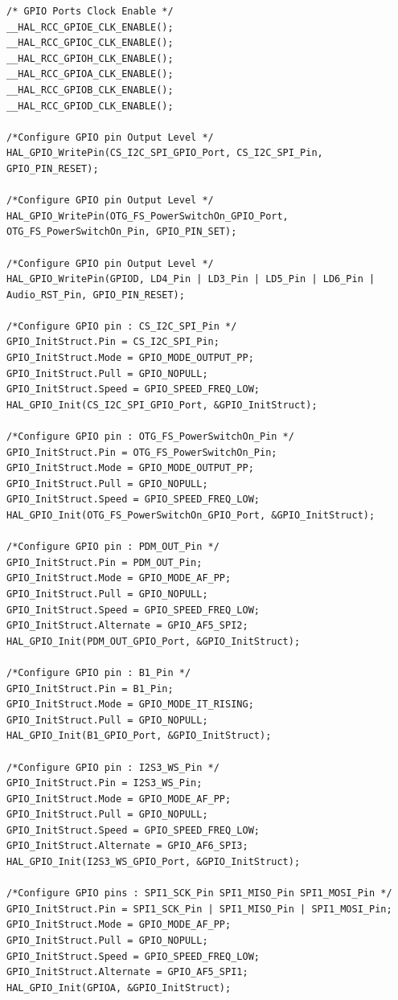 \documentclass[12pt]{report}
\begin{document}
\begin{appendix}
\begin{lstlisting}[basicstyle=\scriptsize\ttfamily]
/* GPIO Ports Clock Enable */
__HAL_RCC_GPIOE_CLK_ENABLE();
__HAL_RCC_GPIOC_CLK_ENABLE();
__HAL_RCC_GPIOH_CLK_ENABLE();
__HAL_RCC_GPIOA_CLK_ENABLE();
__HAL_RCC_GPIOB_CLK_ENABLE();
__HAL_RCC_GPIOD_CLK_ENABLE();

/*Configure GPIO pin Output Level */
HAL_GPIO_WritePin(CS_I2C_SPI_GPIO_Port, CS_I2C_SPI_Pin, GPIO_PIN_RESET);

/*Configure GPIO pin Output Level */
HAL_GPIO_WritePin(OTG_FS_PowerSwitchOn_GPIO_Port, OTG_FS_PowerSwitchOn_Pin, GPIO_PIN_SET);

/*Configure GPIO pin Output Level */
HAL_GPIO_WritePin(GPIOD, LD4_Pin | LD3_Pin | LD5_Pin | LD6_Pin | Audio_RST_Pin, GPIO_PIN_RESET);

/*Configure GPIO pin : CS_I2C_SPI_Pin */
GPIO_InitStruct.Pin = CS_I2C_SPI_Pin;
GPIO_InitStruct.Mode = GPIO_MODE_OUTPUT_PP;
GPIO_InitStruct.Pull = GPIO_NOPULL;
GPIO_InitStruct.Speed = GPIO_SPEED_FREQ_LOW;
HAL_GPIO_Init(CS_I2C_SPI_GPIO_Port, &GPIO_InitStruct);

/*Configure GPIO pin : OTG_FS_PowerSwitchOn_Pin */
GPIO_InitStruct.Pin = OTG_FS_PowerSwitchOn_Pin;
GPIO_InitStruct.Mode = GPIO_MODE_OUTPUT_PP;
GPIO_InitStruct.Pull = GPIO_NOPULL;
GPIO_InitStruct.Speed = GPIO_SPEED_FREQ_LOW;
HAL_GPIO_Init(OTG_FS_PowerSwitchOn_GPIO_Port, &GPIO_InitStruct);

/*Configure GPIO pin : PDM_OUT_Pin */
GPIO_InitStruct.Pin = PDM_OUT_Pin;
GPIO_InitStruct.Mode = GPIO_MODE_AF_PP;
GPIO_InitStruct.Pull = GPIO_NOPULL;
GPIO_InitStruct.Speed = GPIO_SPEED_FREQ_LOW;
GPIO_InitStruct.Alternate = GPIO_AF5_SPI2;
HAL_GPIO_Init(PDM_OUT_GPIO_Port, &GPIO_InitStruct);

/*Configure GPIO pin : B1_Pin */
GPIO_InitStruct.Pin = B1_Pin;
GPIO_InitStruct.Mode = GPIO_MODE_IT_RISING;
GPIO_InitStruct.Pull = GPIO_NOPULL;
HAL_GPIO_Init(B1_GPIO_Port, &GPIO_InitStruct);

/*Configure GPIO pin : I2S3_WS_Pin */
GPIO_InitStruct.Pin = I2S3_WS_Pin;
GPIO_InitStruct.Mode = GPIO_MODE_AF_PP;
GPIO_InitStruct.Pull = GPIO_NOPULL;
GPIO_InitStruct.Speed = GPIO_SPEED_FREQ_LOW;
GPIO_InitStruct.Alternate = GPIO_AF6_SPI3;
HAL_GPIO_Init(I2S3_WS_GPIO_Port, &GPIO_InitStruct);

/*Configure GPIO pins : SPI1_SCK_Pin SPI1_MISO_Pin SPI1_MOSI_Pin */
GPIO_InitStruct.Pin = SPI1_SCK_Pin | SPI1_MISO_Pin | SPI1_MOSI_Pin;
GPIO_InitStruct.Mode = GPIO_MODE_AF_PP;
GPIO_InitStruct.Pull = GPIO_NOPULL;
GPIO_InitStruct.Speed = GPIO_SPEED_FREQ_LOW;
GPIO_InitStruct.Alternate = GPIO_AF5_SPI1;
HAL_GPIO_Init(GPIOA, &GPIO_InitStruct);


\end{lstlisting}
\end{appendix}
\end{document}
